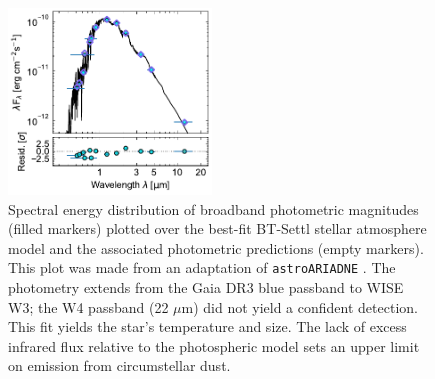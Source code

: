 \documentclass[11pt,twocolumn,tighten,linenumbers]{aastex7}
\begin{document}
\begin{figure}[!t]
  \centering
  \includegraphics[width=0.48\textwidth]{figures/sf4.pdf}
  \caption{
    Spectral energy distribution of broadband photometric magnitudes
    (filled markers) plotted over the best-fit BT-Settl stellar
    atmosphere model \citep{Allard2012} and the associated photometric
    predictions (empty markers).  This plot was made from an
    adaptation of \texttt{astroARIADNE} \citep{Vines2022}.  The
    photometry extends from the Gaia DR3 blue passband to WISE W3;
    the W4 passband (22 $\mu$m) did not yield a confident detection.
    This fit yields the star's temperature and size.  The lack of
    excess infrared flux relative to the photospheric model sets an
    upper limit on emission from circumstellar dust.
    }
  \label{fig:sed}
\end{figure}
\end{document}

